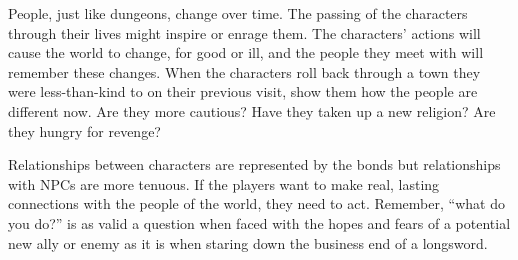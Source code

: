 People, just like dungeons, change over time. The passing of the characters through their lives might inspire or enrage them. The characters' actions will cause the world to change, for good or ill, and the people they meet with will remember these changes. When the characters roll back through a town they were less-than-kind to on their previous visit, show them how the people are different now. Are they more cautious? Have they taken up a new religion? Are they hungry for revenge?

Relationships between characters are represented by the bonds but relationships with NPCs are more tenuous. If the players want to make real, lasting connections with the people of the world, they need to act. Remember, ``what do you do?'' is as valid a question when faced with the hopes and fears of a potential new ally or enemy as it is when staring down the business end of a longsword.

 
